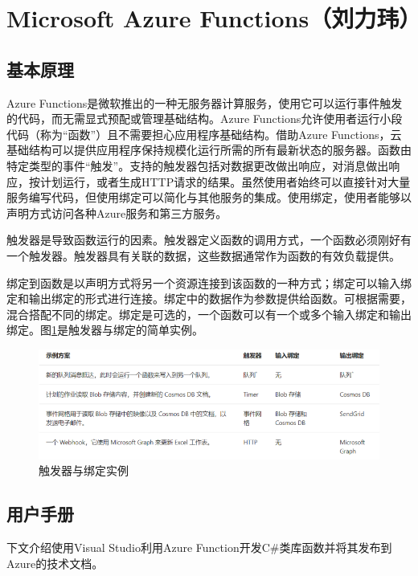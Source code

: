 \section{Microsoft Azure Functions（刘力玮）}\label{sec:azure_use}
\subsection{基本原理}
Azure Functions是微软推出的一种无服务器计算服务，使用它可以运行事件触发的代码，而无需显式预配或管理基础结构。Azure Functions允许使用者运行小段代码（称为“函数”）且不需要担心应用程序基础结构。借助Azure Functions，云基础结构可以提供应用程序保持规模化运行所需的所有最新状态的服务器。函数由特定类型的事件“触发”。支持的触发器包括对数据更改做出响应，对消息做出响应，按计划运行，或者生成HTTP请求的结果。虽然使用者始终可以直接针对大量服务编写代码，但使用绑定可以简化与其他服务的集成。使用绑定，使用者能够以声明方式访问各种Azure服务和第三方服务。

触发器是导致函数运行的因素。触发器定义函数的调用方式，一个函数必须刚好有一个触发器。触发器具有关联的数据，这些数据通常作为函数的有效负载提供。

绑定到函数是以声明方式将另一个资源连接到该函数的一种方式；绑定可以输入绑定和输出绑定的形式进行连接。绑定中的数据作为参数提供给函数。可根据需要，混合搭配不同的绑定。绑定是可选的，一个函数可以有一个或多个输入绑定和输出绑定。图\ref{fig1}是触发器与绑定的简单实例。

\begin{figure}[!htbp]
	\centering
	\includegraphics[scale=0.6]{figs/1.png}
	\caption{触发器与绑定实例}
	\label{fig1}	
\end{figure}

\subsection{用户手册}
下文介绍使用Visual Studio利用Azure Function开发C\#类库函数并将其发布到 Azure的技术文档。

